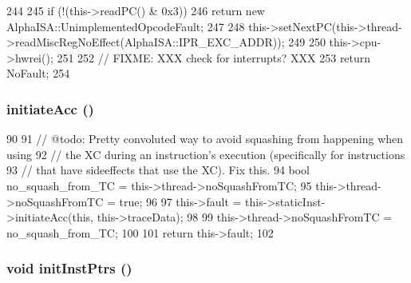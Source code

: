 \begin{DoxyCode}
244 {
245     if (!(this->readPC() & 0x3))
246         return new AlphaISA::UnimplementedOpcodeFault;
247 
248     this->setNextPC(this->thread->readMiscRegNoEffect(AlphaISA::IPR_EXC_ADDR));
249 
250     this->cpu->hwrei();
251 
252     // FIXME: XXX check for interrupts? XXX
253     return NoFault;
254 }
\end{DoxyCode}
\hypertarget{classOzoneDynInst_af8310f8618e710a06b0c2cbface6ac72}{
\subsubsection[{initiateAcc}]{ initiateAcc ()}}
\label{classOzoneDynInst_af8310f8618e710a06b0c2cbface6ac72}



\begin{DoxyCode}
90 {
91     // @todo: Pretty convoluted way to avoid squashing from happening when using
92     // the XC during an instruction's execution (specifically for instructions
93     // that have sideeffects that use the XC).  Fix this.
94     bool no_squash_from_TC = this->thread->noSquashFromTC;
95     this->thread->noSquashFromTC = true;
96 
97     this->fault = this->staticInst->initiateAcc(this, this->traceData);
98 
99     this->thread->noSquashFromTC = no_squash_from_TC;
100 
101     return this->fault;
102 }
\end{DoxyCode}
\hypertarget{classOzoneDynInst_a8a9b6f687d8c5d04a03602a407423179}{
\subsubsection[{initInstPtrs}]{\setlength{\rightskip}{0pt plus 5cm}void initInstPtrs ()}}
\label{classOzoneDynInst_a8a9b6f687d8c5d04a03602a407423179}



